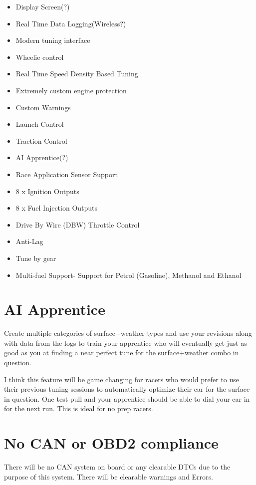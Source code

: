 \documentclass{article}
\begin{document}
\begin{itemize}
    \item Display Screen(?)
    \item Real Time Data Logging(Wireless?)
    \item Modern tuning interface
    \item Wheelie control
    \item Real Time Speed Density Based Tuning
    \item Extremely custom engine protection
    \item Custom Warnings
    \item Launch Control
    \item Traction Control
    \item AI Apprentice(?)
    \item Race Application Sensor Support
    \item 8 x Ignition Outputs
    \item 8 x Fuel Injection Outputs
    \item Drive By Wire (DBW) Throttle Control
    \item Anti-Lag
    \item Tune by gear
    \item Multi-fuel Support- Support for Petrol (Gasoline), Methanol and Ethanol
    
\end{itemize}

\section{AI Apprentice}
Create multiple categories of surface+weather types and use your revisions along with data from the logs to train your apprentice who will eventually get just as good as you at finding a near perfect tune for the surface+weather combo in question.

\vspace{0.5cm}

\noindent
I think this feature will be game changing for racers who would prefer to use their previous tuning sessions to automatically optimize their car for the surface in question. One test pull and your apprentice should be able to dial your car in for the next run. This is ideal for no prep racers.

\section{No CAN or OBD2 compliance}
There will be no CAN system on board or any clearable DTCs due to the purpose of this system. There will be clearable warnings and Errors.
\newpage
\end{document}
